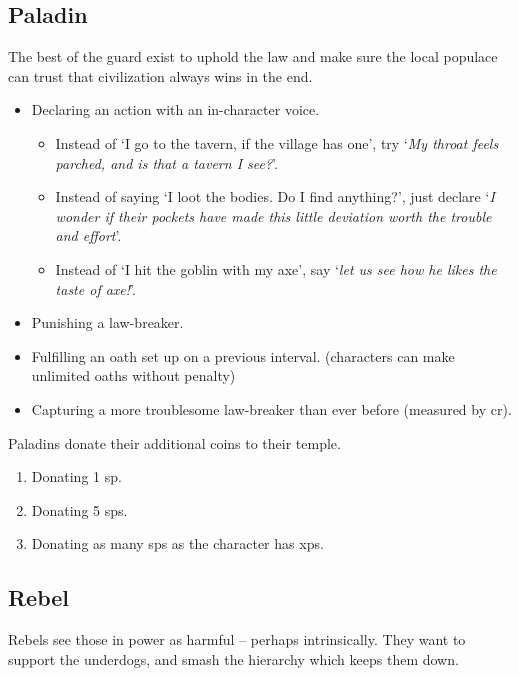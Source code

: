 \begin{multicols}{2}
\subsection{Paladin}
\label{paladin}

The best of the \gls{guard} exist to uphold the law and make sure the local populace can trust that civilization always wins in the end.

\begin{itemize}
  \item
  Declaring an action with an in-character voice.
  \begin{itemize}
    \item
    Instead of `I go to the tavern, if the \gls{village} has one', try `\textit{My throat feels parched, and is that a tavern I see?}'.
    \item
    Instead of saying `I loot the bodies. Do I find anything?', just declare `\textit{I wonder if their pockets have made this little deviation worth the trouble and effort}'.
    \item
    Instead of `I hit the goblin with my axe', say `\textit{let us see how he likes the taste of axe!}'.
  \end{itemize}
  \item
  Punishing a law-breaker.
  \item
  Fulfilling an oath set up on a previous \gls{interval}.
  (characters can make unlimited oaths without penalty)
  \item
  Capturing a more troublesome law-breaker than ever before (measured by \gls{cr}).
\end{itemize}

Paladins donate their additional coins to their \gls{temple}.

\begin{enumerate}
  \item
  Donating 1 \gls{sp}.
  \item
  Donating 5 \glspl{sp}.
  \item
  Donating as many \glspl{sp} as the character has \glspl{xp}.
\end{enumerate}

\subsection{Rebel}
\label{rebel}

Rebels see those in power as harmful -- perhaps intrinsically.
They want to support the underdogs, and smash the hierarchy which keeps them down.


\end{multicols}

